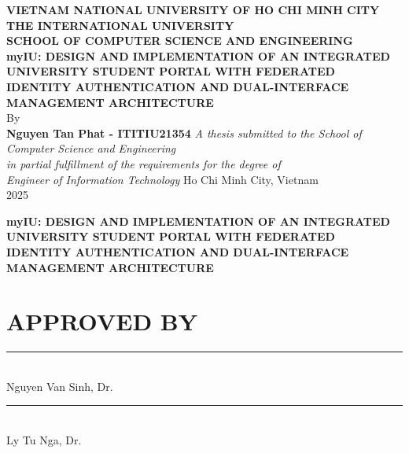 \documentclass[12pt,a4paper]{report}
\author{}
\date{}
\begin{document}

\begin{titlepage}
    \centering
    \vspace*{0.2in}
    \textbf{VIETNAM NATIONAL UNIVERSITY OF HO CHI MINH CITY}\\
    \textbf{THE INTERNATIONAL UNIVERSITY}\\
    \textbf{SCHOOL OF COMPUTER SCIENCE AND ENGINEERING}\\[0.4in]
    \textbf{myIU: DESIGN AND IMPLEMENTATION OF AN INTEGRATED UNIVERSITY STUDENT PORTAL WITH FEDERATED IDENTITY AUTHENTICATION AND DUAL-INTERFACE MANAGEMENT ARCHITECTURE}\\[0.2in]
    By\\[0.2in]
    \textbf{Nguyen Tan Phat - ITITIU21354}
    \vfill
    \textit{A thesis submitted to the School of Computer Science and Engineering}\\
    \textit{in partial fulfillment of the requirements for the degree of}\\
    \textit{Engineer of Information Technology}
    \vfill
    Ho Chi Minh City, Vietnam\\
    2025
\end{titlepage}

\newpage
\thispagestyle{empty}
\begin{center}
\textbf{myIU: DESIGN AND IMPLEMENTATION OF AN INTEGRATED UNIVERSITY STUDENT PORTAL WITH FEDERATED IDENTITY AUTHENTICATION AND DUAL-INTERFACE MANAGEMENT ARCHITECTURE}
\end{center}
\vspace{0.5in}
\section*{APPROVED BY}
\vspace{1in}
\noindent\rule{10cm}{0.4pt} \\
Nguyen Van Sinh, Dr.
\vspace{1in}
\noindent\rule{10cm}{0.4pt} \\
Ly Tu Nga, Dr.

\newpage
\end{document}
